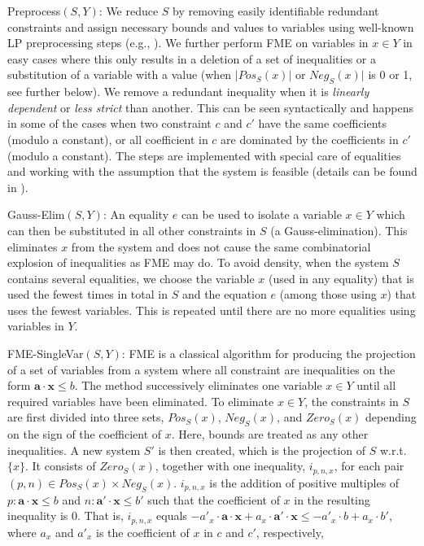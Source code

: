 \documentclass{llncs}
\newcommand{\Pos}{\mathit{Pos}}
\newcommand{\Neg}{\mathit{Neg}}
\newcommand{\mi}{\mathit}
\newcommand{\ve}{\mathbf}
\begin{document}
{{\sc Preprocess}$(S,Y)$:} We reduce $S$ by removing easily identifiable redundant constraints and assign necessary bounds and values to variables using well-known LP preprocessing steps (e.g., \cite{andersen95}). 
We further perform FME on variables in $x\in Y$ in easy cases where this only results in a deletion of a set of inequalities or a substitution of a variable with a value (when $|\Pos_S(x)|$ or $\Neg_S(x)|$ is 0 or 1, see further below). We remove a redundant inequality when it is \emph{linearly dependent} or \emph{less strict} than another. This can be seen syntactically and happens in some of the cases when two constraint $c$ and $c'$ have the same coefficients (modulo a constant), or all coefficient in $c$ are dominated by the coefficients in $c'$ (modulo a constant). 
The steps are implemented with special care of equalities and working with the assumption that the system is feasible (details can be found in \cite{mytechrep}).

{{\sc Gauss-Elim}$(S,Y)$:} An equality $e$ can be used to isolate a variable $x\in Y$ which can then be substituted in all other constraints in $S$ (a Gauss-elimination). This eliminates $x$ from the system and does not cause the same combinatorial explosion of inequalities as FME may do.
To avoid density, when the system $S$ contains several equalities, we choose the variable $x$ (used in any equality) that is used the fewest times in total in $S$ and the equation $e$ (among those using $x$) that uses the fewest variables. 
This is repeated until there are no more equalities using variables in $Y$.

{{\sc FME-SingleVar}$(S,Y)$:} FME is a classical algorithm for producing the projection of a set of variables from a system where all constraint are inequalities on the form $\ve{a}\cdot \ve{x}\leq b$. The method successively eliminates one variable $x\in Y$ until all required variables have been eliminated. To eliminate $x\in Y$, the constraints in $S$ are first divided into three sets, $\Pos_S(x)$, $\Neg_S(x)$, and $\mi{Zero}_S(x)$ depending on the sign of the coefficient of $x$. Here, bounds are treated as any other inequalities. 
A new system $S'$ is then created, which is the projection of $S$ w.r.t. $\{x\}$. It consists of $\mi{Zero}_S(x)$, together with one inequality, $i_{p,n,x}$, for each pair $(p,n)\in \Pos_S(x)\times \Neg_S(x)$. $i_{p,n,x}$ is the addition of positive multiples of $p:\ve{a}\cdot\ve{x} \leq b$ and $n:\ve{a}'\cdot\ve{x} \leq b'$ such that the coefficient of $x$ in the resulting inequality is $0$. That is, $i_{p,n,x}$ equals $-a'_x\cdot \ve{a}\cdot\ve{x} + a_x\cdot \ve{a}'\cdot\ve{x} \leq -a'_x\cdot b + a_x\cdot b'$, where $a_x$ and $a'_x$ is the coefficient of $x$ in $c$ and $c'$, respectively,
\end{document}
